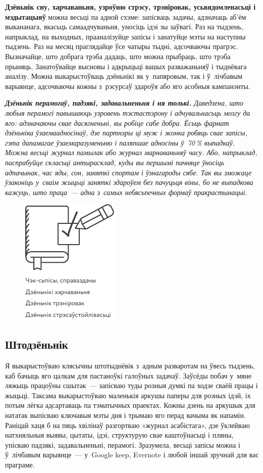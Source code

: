 \textbf{Дзёньнік сну, харчаваньня, узроўню стрэсу, трэніровак, усьвядомленасьці і мэдытацыяў} можна весьці па адной схэме: запісваць задачы, адзначаць аб'ём выкананага, якасьць самаадчуваньня, уносіць ідэі зы заўвагі. Раз на тыдзень, напрыклад, на выходных, прааналізуйце запісы і занатуйце мэты на наступны тыдзень. Раз на месяц праглядайце ўсе чатыры тыдні, адсочваючы прагрэс. Вызначайце, што добрага трэба дадаць, што можна прыбраць, што трэба прыняць. Занатоўвайце высновы і адкрыцьці вашых разважаньняў і тыднёвага аналізу. Можна выкарыстоўваць дзёньнікі як у~папяровым, так і ў~лічбавым варыянце, адсочваючы кожны з~рэсурсаў здароўя або яго асобныя кампанэнты.

\emph{\textbf{Дзёньнік перамогаў, падзякі, задавальненьня і ня толькі.} Даведзена, што любыя перамогі павышаюць узровень тэстастэрону і адчувальнасьць мозгу да яго: адзначаючы свае дасягненьні, вы робіце сабе добра. Ёсьць фармат дзёньніка ўзаемаадносінаў, дзе партнэры ці муж і жонка робяць свае запісы, гэта дапамагае ўзаемаразуменьню і паляпшае адносіны ў~70\,\% выпадкаў. Можна весьці журнал памылак або журнал марнаваньняў часу. Або, напрыклад, паспрабуйце скласьці антырасклад, куды вы першымі пачняце ўносіць адпачынак, час яды, сон, заняткі спортам і ўзнагароды сябе. Так вы зможаце ўзаконіць у~сваім жыцьці заняткі здароўем без пачуцьця віны, бо не выпадкова кажуць, што праца~--- адна з~самых небясьпечных формаў пракрастынацыі.}

\begin{figure}[htb!]
  \centering
  \includegraphics[scale=1.5]{willpower/ch3/3.pdf}
\end{figure}

\subsection*{Штодзёньнік}

Я выкарыстоўваю клясычны штотыднёвік з~адным разваротам на ўвесь тыдзень, каб бачыць яго цалкам для пастаноўкі галоўных задачаў. Заўсёды побач у~мяне ляжыць працоўны сшытак~--- запісваю туды розныя думкі па ходзе сваёй працы і жыцьці. Таксама выкарыстоўваю маленькія аркушы паперы для розных ідэй, іх потым лёгка адсартаваць па тэматычных праектах. Кожны дзень на аркушык для нататак выпісваю ключавыя мэты дня і трымаю яго перад вачыма як напамін. Раніцай хаця б на пяць хвілінаў разгортваю «журнал асабістага», дзе ўклейваю натхняльныя выявы, цытаты, ідэі, структурую свае каштоўнасьці і пляны, упісваю падзякі, задавальненьні, перамогі. Зразумела, весьці запісы можна і ў~лічбавым варыянце~--- у~Google keep, Evernote і любой іншай зручнай для вас праграме.

